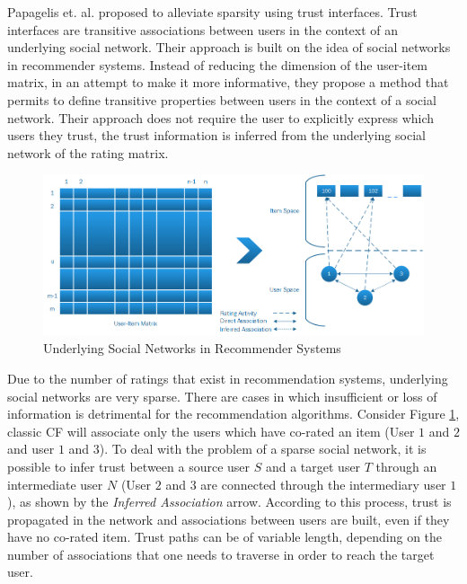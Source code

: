 
Papagelis et. al. \cite{Papagelis2005} proposed to alleviate sparsity using trust interfaces. Trust interfaces are transitive associations between users in the context of an underlying social network. Their approach is built on the idea of social networks in recommender systems. Instead of reducing the dimension of the user-item matrix, in an attempt to make it more informative, they propose a method that permits to define transitive properties between users in the context of a social network. Their approach does not require the user to explicitly express which users they trust, the trust information is inferred from the underlying social network of the rating matrix.

\begin{figure}[H]
    \includegraphics[width=5in]{image/trustnetwork.png}
    \centering
    \caption[Underlying Social Networks in Recommender Systems]{Underlying Social Networks in Recommender Systems}
    \label{figure:cfsocialnetwork}
\end{figure}

Due to the number of ratings that exist in recommendation systems, underlying social networks are very sparse. There are cases in which insufficient or loss of information is detrimental for the recommendation algorithms. Consider Figure \ref{figure:cfsocialnetwork}, classic CF will associate only the users which have co-rated an item (User $1$ and $2$ and user $1$ and $3$). To deal with the problem of a sparse social network, it is possible to infer trust between a source user $S$ and a target user $T$ through an intermediate user $N$ (User $2$ and $3$ are connected through the intermediary user $1$), as shown by the \emph{Inferred Association} arrow. According to this process, trust is propagated in the network and associations between users are built, even if they have no co-rated item. Trust paths can be of variable length, depending on the number of associations that one needs to traverse in order to reach the target user.

